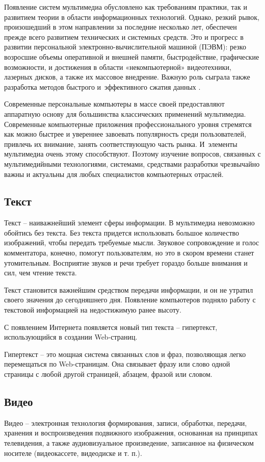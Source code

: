 \documentclass{ou}
\begin{document}
Появление систем мультимедиа обусловлено как требованиям практики, так и развитием теории в области информационных технологий. Однако, резкий рывок, произошедший в этом направлении за последние несколько лет, обеспечен прежде всего развитием технических и системных средств. Это и прогресс в развитии персональной электронно-вычислительной машиной (ПЭВМ): резко возросшие объемы оперативной и внешней памяти, быстродействие, графические возможности, и достижения в области «некомпьютерной» видеотехники, лазерных дисков, а также их массовое внедрение. Важную роль сыграла также разработка методов быстрого и~эффективного сжатия данных \cite{Katsko_2015}.

Современные персональные компьютеры в массе своей предоставляют аппаратную основу для большинства классических применений мультимедиа. Современные компьютерные приложения профессионального уровня стремятся как можно быстрее и увереннее завоевать популярность среди пользователей, привлечь их внимание, занять соответствующую часть рынка. И~элементы мультимедиа очень этому способствуют. Поэтому изучение вопросов, связанных с мультимедийными технологиями, системами, средствами разработки чрезвычайно важны и актуальны для любых специалистов компьютерных отраслей\cite{digitalocean}.
\subsection{Текст}
Текст -- наиважнейший элемент сферы информации. В мультимедиа невозможно обойтись без текста. Без текста придется использовать большое количество изображений, чтобы передать требуемые мысли. Звуковое сопровождение и голос комментатора, конечно, помогут пользователям, но это в скором времени станет утомительным. Восприятие звуков и речи требует гораздо больше внимания и сил, чем чтение текста.

Текст становится важнейшим средством передачи информации, и он не утратил своего значения до сегодняшнего дня. Появление компьютеров подняло работу с текстовой информацией на недостижимую ранее высоту.

С появлением Интернета появляется новый тип текста -- гипертекст, использующийся в создании Web-страниц.

Гипертекст -- это мощная система связанных слов и фраз, позволяющая легко перемещаться по Web-страницам. Она связывает фразу или слово одной страницы с любой другой страницей, абзацем, фразой или словом\cite{Panasenko_2022}.
\subsection{Видео}
Видео -- электронная технология формирования, записи, обработки, передачи, хранения и воспроизведения подвижного изображения, основанная на принципах телевидения, а также аудиовизуальное произведение, записанное на физическом носителе (видеокассете, видеодиске и т. п.).
\end{document}
